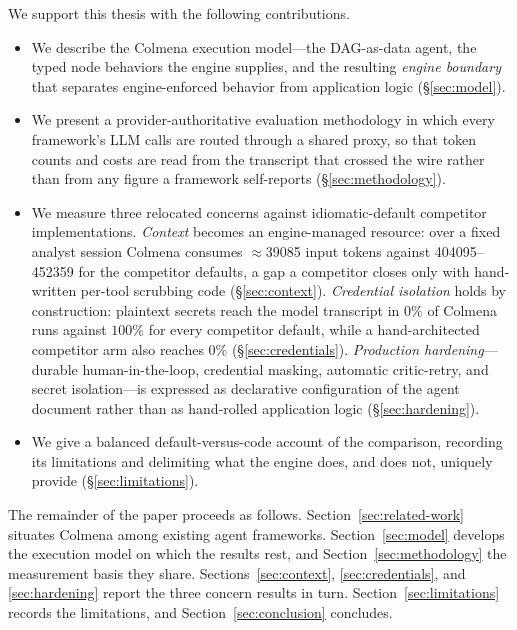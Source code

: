 We support this thesis with the following contributions.

\begin{itemize}
  \item We describe the Colmena execution model---the DAG-as-data agent, the
    typed node behaviors the engine supplies, and the resulting
    \emph{engine boundary} that separates engine-enforced behavior from
    application logic (\S\ref{sec:model}).
  \item We present a provider-authoritative evaluation methodology in which
    every framework's LLM calls are routed through a shared proxy, so that
    token counts and costs are read from the transcript that crossed the wire
    rather than from any figure a framework self-reports (\S\ref{sec:methodology}).
  \item We measure three relocated concerns against idiomatic-default
    competitor implementations. \emph{Context} becomes an engine-managed
    resource: over a fixed analyst session Colmena consumes
    $\approx$\num{39085} input tokens against \numrange{404095}{452359} for
    the competitor defaults, a gap a competitor closes only with hand-written
    per-tool scrubbing code (\S\ref{sec:context}). \emph{Credential isolation}
    holds by construction: plaintext secrets reach the model transcript in
    $0\%$ of Colmena runs against $100\%$ for every competitor default, while
    a hand-architected competitor arm also reaches $0\%$ (\S\ref{sec:credentials}).
    \emph{Production hardening}---durable human-in-the-loop, credential
    masking, automatic critic-retry, and secret isolation---is expressed as
    declarative configuration of the agent document rather than as
    hand-rolled application logic (\S\ref{sec:hardening}).
  \item We give a balanced default-versus-code account of the comparison,
    recording its limitations and delimiting what the engine does, and
    does not, uniquely provide (\S\ref{sec:limitations}).
\end{itemize}

The remainder of the paper proceeds as follows. Section~\ref{sec:related-work}
situates Colmena among existing agent frameworks. Section~\ref{sec:model}
develops the execution model on which the results rest, and
Section~\ref{sec:methodology} the measurement basis they share.
Sections~\ref{sec:context}, \ref{sec:credentials}, and \ref{sec:hardening}
report the three concern results in turn. Section~\ref{sec:limitations}
records the limitations, and
Section~\ref{sec:conclusion} concludes.

